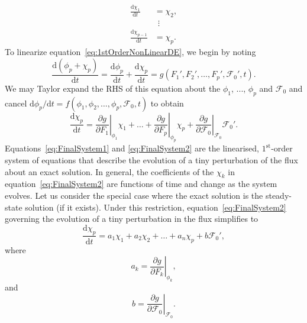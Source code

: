 \documentclass[a4paper,fleqn,usenatbib]{mnras}
\begin{document}
\begin{equation}\label{eq:FinalSystem1}
\begin{aligned}
\frac{\mathrm{d}\chi_{1}}{\mathrm{d}t} &= \chi_{2}, \\
&\ \ \vdots \\
 \frac{\mathrm{d}\chi_{p-1}}{\mathrm{d}t} &= \chi_{p}.
\end{aligned}
\end{equation}
To linearize equation~\eqref{eq:1stOrderNonLinearDE}, we begin by noting
\begin{equation}\label{eq:TempStep01}
\frac{\mathrm{d}(\phi_{p} + \chi_{p})}{\mathrm{d}t} = \frac{\mathrm{d}\phi_{p}}{\mathrm{d}t} + \frac{\mathrm{d}\chi_{p}}{\mathrm{d}t} = g(F_{1}',F_{2}',\ldots,F_{p}',\mathcal{F}_{0}',t).
\end{equation}
We may Taylor expand the RHS of this equation about the $\phi_{1}$, ..., $\phi_{p}$ and $\mathcal{F}_{0}$ and cancel $\mathrm{d}\phi_{p}/\mathrm{d}t = f(\phi_{1},\phi_{2},\ldots,\phi_{p},\mathcal{F}_{0},t)$ to obtain
\begin{equation}\label{eq:FinalSystem2}
\frac{\mathrm{d}\chi_{p}}{\mathrm{d}t} = \left.{\frac{\partial g}{\partial F_{1}}}\right \vert_{\phi_{1}} \chi_{1} + \ldots + \left.{\frac{\partial g}{\partial F_{p}}}\right \vert_{\phi_{p}} \chi_{p} + \left.{\frac{\partial g}{\partial \mathcal{F}_{0}}}\right \vert_{\mathcal{F}_{0}}\mathcal{F}_{0}'.
\end{equation}
Equations~\eqref{eq:FinalSystem1} and \eqref{eq:FinalSystem2} are the linearised, $1^{\mathrm{st}}$-order system of equations that describe the evolution of a tiny perturbation of the flux about an exact solution. In general, the coefficients of the $\chi_{k}$ in equation~\eqref{eq:FinalSystem2} are functions of time and change as the system evolves. Let us consider the special case where the exact solution is the steady-state solution (if it exists). Under this restriction, equation~\eqref{eq:FinalSystem2} governing the evolution of a tiny perturbation in the flux simplifies to
\begin{equation}\label{eq:FinalSystem3}
\frac{\mathrm{d}\chi_{p}}{\mathrm{d}t} = a_{1} \chi_{1} + a_{2} \chi_{2} + \ldots + a_{n} \chi_{p} + b \mathcal{F}_{0}',
\end{equation} 
where 
\begin{equation}\label{eq:aCoefficients}
a_{k} = \left.{\frac{\partial g}{\partial F_{k}}}\right \vert_{\phi_{k}},
\end{equation}
and
\begin{equation}\label{eq:bCoefficients}
b = \left.{\frac{\partial g}{\partial \mathcal{F}_{0}}}\right \vert_{\mathcal{F}_{0}}.
\end{equation}
\end{document}
